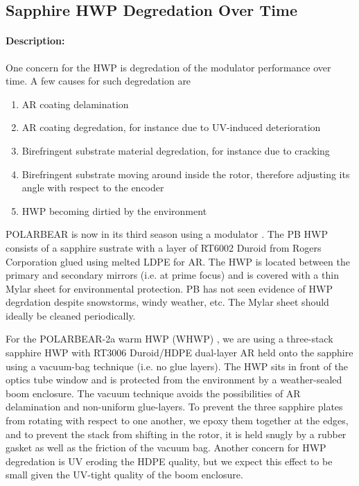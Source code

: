 \subsection{Sapphire HWP Degredation Over Time}

\paragraph{Description:} 

One concern for the HWP is degredation of the modulator performance over time. A few causes for such degredation are

\begin{enumerate}
	\item AR coating delamination
	\item AR coating degredation, for instance due to UV-induced deterioration
	\item Birefringent substrate material degredation, for instance due to cracking
	\item Birefringent substrate moving around inside the rotor, therefore adjusting its angle with respect to the encoder
	\item HWP becoming dirtied by the environment
\end{enumerate}

POLARBEAR is now in its third season using a modulator \cite{PB1_WHWP}. The PB HWP consists of a sapphire sustrate with a layer of RT6002 Duroid from Rogers Corporation glued using melted LDPE for AR. The HWP is located between the primary and secondary mirrors (i.e. at prime focus) and is covered with a thin Mylar sheet for environmental protection. PB has not seen evidence of HWP degrdation despite snowstorms, windy weather, etc. The Mylar sheet should ideally be cleaned periodically.

For the POLARBEAR-2a warm HWP (WHWP) \cite{PB2a_WHWP}, we are using a three-stack sapphire HWP with RT3006 Duroid/HDPE dual-layer AR held onto the sapphire using a vacuum-bag technique (i.e. no glue layers). The HWP sits in front of the optics tube window and is protected from the environment by a weather-sealed boom enclosure. The vacuum technique avoids the possibilities of AR delamination and non-uniform glue-layers. To prevent the three sapphire plates from rotating with respect to one another, we epoxy them together at the edges, and to prevent the stack from shifting in the rotor, it is held snugly by a rubber gasket as well as the friction of the vacuum bag. Another concern for HWP degredation is UV eroding the HDPE quality, but we expect this effect to be small given the UV-tight quality of the boom enclosure.

